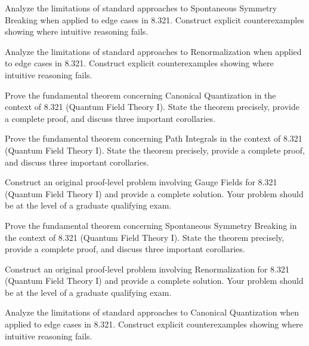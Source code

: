 \documentclass[12pt,a4paper]{exam}
\begin{document}
\begin{questions}
\vspace{0.3cm}

\question[2]
Analyze the limitations of standard approaches to Spontaneous Symmetry Breaking when applied to edge cases in 8.321. Construct explicit counterexamples showing where intuitive reasoning fails.

\vspace{0.3cm}

\question[2]
Analyze the limitations of standard approaches to Renormalization when applied to edge cases in 8.321. Construct explicit counterexamples showing where intuitive reasoning fails.

\vspace{0.3cm}

\question[6]
Prove the fundamental theorem concerning Canonical Quantization in the context of 8.321 (Quantum Field Theory I). State the theorem precisely, provide a complete proof, and discuss three important corollaries.

\vspace{0.3cm}

\question[3]
Prove the fundamental theorem concerning Path Integrals in the context of 8.321 (Quantum Field Theory I). State the theorem precisely, provide a complete proof, and discuss three important corollaries.

\vspace{0.3cm}

\question[5]
Construct an original proof-level problem involving Gauge Fields for 8.321 (Quantum Field Theory I) and provide a complete solution. Your problem should be at the level of a graduate qualifying exam.

\vspace{0.3cm}

\question[2]
Prove the fundamental theorem concerning Spontaneous Symmetry Breaking in the context of 8.321 (Quantum Field Theory I). State the theorem precisely, provide a complete proof, and discuss three important corollaries.

\vspace{0.3cm}

\question[3]
Construct an original proof-level problem involving Renormalization for 8.321 (Quantum Field Theory I) and provide a complete solution. Your problem should be at the level of a graduate qualifying exam.

\vspace{0.3cm}

\question[4]
Analyze the limitations of standard approaches to Canonical Quantization when applied to edge cases in 8.321. Construct explicit counterexamples showing where intuitive reasoning fails.


\end{questions}
\end{document}
